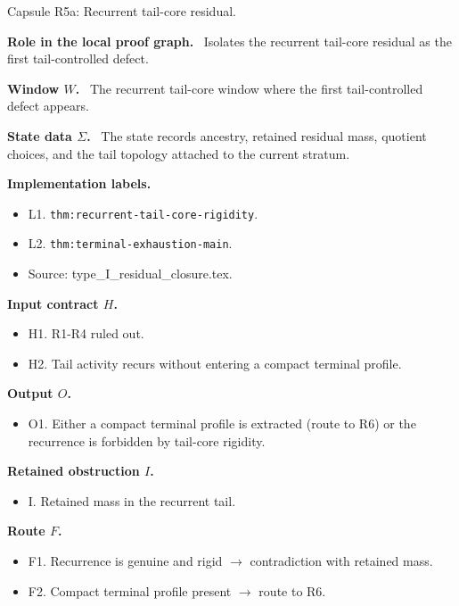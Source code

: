 \documentclass[11pt]{amsart}
\newcommand{\capsulefield}[1]{\par\smallskip\noindent\textbf{#1.}\ }
\begin{document}
\begin{proofcapsule}{Capsule R5a: Recurrent tail-core residual.}
  \capsulefield{Role in the local proof graph}
  Isolates the recurrent tail-core residual as the first tail-controlled defect.

  \capsulefield{Window \(W\)}
The recurrent tail-core window where the first tail-controlled defect appears.

  \capsulefield{State data \(\Sigma\)}
The state records ancestry, retained residual mass, quotient choices, and the tail topology attached to the current stratum.

  \capsulefield{Implementation labels}
  \begin{itemize}[leftmargin=1.8em]
  \item L1. \texttt{thm:recurrent-tail-core-rigidity}.
  \item L2. \texttt{thm:terminal-exhaustion-main}.
  \item Source: type\_I\_residual\_closure.tex.
  \end{itemize}

  \capsulefield{Input contract \(H\)}
  \begin{itemize}[leftmargin=1.8em]
  \item H1. R1-R4 ruled out.
  \item H2. Tail activity recurs without entering a compact terminal profile.
  \end{itemize}

  \capsulefield{Output \(O\)}
  \begin{itemize}[leftmargin=1.8em]
  \item O1. Either a compact terminal profile is extracted (route to R6) or the recurrence is forbidden by tail-core rigidity.
  \end{itemize}

  \capsulefield{Retained obstruction \(I\)}
  \begin{itemize}[leftmargin=1.8em]
  \item I. Retained mass in the recurrent tail.
  \end{itemize}

  \capsulefield{Route \(F\)}
  \begin{itemize}[leftmargin=1.8em]
  \item F1. Recurrence is genuine and rigid $\to$ contradiction with retained mass.
  \item F2. Compact terminal profile present $\to$ route to R6.
  \end{itemize}


\end{proofcapsule}
\end{document}
